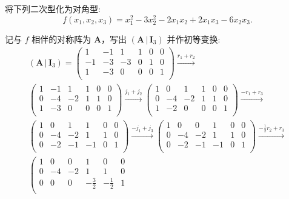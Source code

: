 \documentclass[../../main.tex]{subfiles}%
\begin{document}
\begin{example}\label{example:二次型化简-初等变换法例题1}
将下列二次型化为对角型:
\[
f(x_1,x_2,x_3)=x_1^2 - 3x_2^2 - 2x_1x_2 + 2x_1x_3 - 6x_2x_3.
\]
\end{example}
\begin{solution}
记与 $f$ 相伴的对称阵为 $\boldsymbol{A}$，写出 $(\boldsymbol{A}\,|\,\boldsymbol{I}_3)$ 并作初等变换:
\begin{gather*}
\left( \boldsymbol{A}\,|\,\boldsymbol{I}_3 \right) =\left( \begin{matrix}
1&		-1&		1&		1&		0&		0\\
-1&		-3&		-3&		0&		1&		0\\
1&		-3&		0&		0&		0&		1\\
\end{matrix} \right) \xrightarrow{r_1+r_2}
\\
\left( \begin{matrix}
1&		-1&		1&		1&		0&		0\\
0&		-4&		-2&		1&		1&		0\\
1&		-3&		0&		0&		0&		1\\
\end{matrix} \right) \xrightarrow{j_1+j_2}\left( \begin{matrix}
1&		0&		1&		1&		0&		0\\
0&		-4&		-2&		1&		1&		0\\
1&		-2&		0&		0&		0&		1\\
\end{matrix} \right) \xrightarrow{-r_1+r_3}
\\
\left( \begin{matrix}
1&		0&		1&		1&		0&		0\\
0&		-4&		-2&		1&		1&		0\\
0&		-2&		-1&		-1&		0&		1\\
\end{matrix} \right) \xrightarrow{-j_1+j_3}\left( \begin{matrix}
1&		0&		0&		1&		0&		0\\
0&		-4&		-2&		1&		1&		0\\
0&		-2&		-1&		-1&		0&		1\\
\end{matrix} \right) \xrightarrow{-\frac{1}{2}r_2+r_3}
\\
\left( \begin{matrix}
1&		0&		0&		1&		0&		0\\
0&		-4&		-2&		1&		1&		0\\
0&		0&		0&		-\frac{3}{2}&		-\frac{1}{2}&		1\\

\end{matrix}
\end{gather*}
\end{solution}
\end{document}
